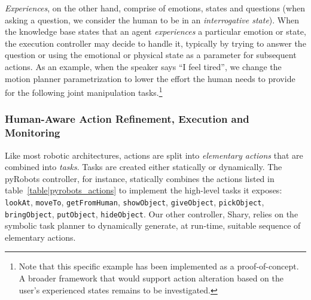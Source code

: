 \documentclass[preprint,3p,times]{elsarticle}
\begin{document}
\emph{Experiences}, on the other hand, comprise of emotions, states and
questions (when asking a question, we consider the human to be in an
\emph{interrogative state}). When the knowledge base states that an agent
\emph{experiences} a particular emotion or state, the execution controller may
decide to handle it, typically by trying to answer the question or using the
emotional or physical state as a parameter for subsequent actions. As an
example, when the speaker says ``I feel tired'', we change the motion planner
parametrization to lower the effort the human needs to provide for the following
joint manipulation tasks.\footnote{Note that this specific example has been
implemented as a proof-of-concept. A broader framework that would support
action alteration based on the user's experienced states remains to be investigated.}

\subsubsection{Human-Aware Action Refinement, Execution and Monitoring}\label{sec:action}

Like most robotic architectures, actions are split into \emph{elementary actions}
that are combined into \emph{tasks}. Tasks are created either statically or dynamically.
The {\sc pyRobots} controller, for instance, statically combines the actions listed in
table~\ref{table|pyrobots_actions} to implement the high-level tasks it exposes: {\tt
lookAt}, {\tt moveTo}, {\tt getFromHuman}, {\tt showObject}, {\tt giveObject},
{\tt pickObject}, {\tt bringObject}, {\tt putObject}, {\tt hideObject}.
Our other controller, {\sc Shary}, relies on the symbolic task planner to
dynamically generate, at run-time, suitable sequence of elementary actions.
\end{document}
